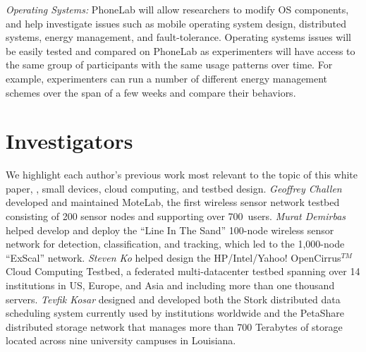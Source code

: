 \emph{Operating Systems:} PhoneLab will allow researchers to modify OS
components, and help investigate issues such as mobile operating system
design, distributed systems, energy management, and fault-tolerance. Operating
systems issues will be easily tested and compared on PhoneLab as experimenters
will have access to the same group of participants with the same usage patterns
over time. For example, experimenters can run a number of different energy
management schemes over the span of a few weeks and compare their behaviors.

%
%
%

\section{Investigators}
We highlight each author's previous work most relevant to the topic of this
white paper, \ie, small devices, cloud computing, and testbed design.
\emph{Geoffrey Challen} developed and maintained MoteLab, the first wireless
sensor network testbed consisting of 200 sensor nodes and supporting over
700~users. \emph{Murat Demirbas} helped develop and deploy the ``Line In
The Sand'' 100-node wireless sensor network for detection, classification,
and tracking, which led to the 1,000-node ``ExScal'' network. \emph{Steven
Ko} helped design the HP/Intel/Yahoo! OpenCirrus$^{TM}$ Cloud
Computing Testbed, a federated multi-datacenter testbed spanning over
14 institutions in US, Europe, and Asia and including more than one
thousand servers. \emph{Tevfik Kosar} designed and developed both the
Stork distributed data scheduling system currently used by institutions
worldwide and the PetaShare distributed storage network that manages more
than 700 Terabytes of storage located across nine university campuses in
Louisiana.


